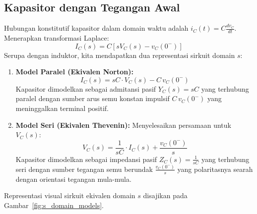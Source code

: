 \documentclass[11pt,a4paper]{article}
\theoremstyle{definition}
\begin{document}
\subsection{Kapasitor dengan Tegangan Awal}
Hubungan konstitutif kapasitor dalam domain waktu adalah $i_C(t) = C \frac{dv_C}{dt}$. Menerapkan transformasi Laplace:
\begin{equation}
    I_C(s) = C \left[ s V_C(s) - v_C(0^-) \right]
\end{equation}
Serupa dengan induktor, kita mendapatkan dua representasi sirkuit domain $s$:
\begin{enumerate}[leftmargin=*]
    \item \textbf{Model Paralel (Ekivalen Norton):}
    \begin{equation}
        I_C(s) = sC \cdot V_C(s) - C \, v_C(0^-)
        \label{eq:capacitor_norton}
    \end{equation}
    Kapasitor dimodelkan sebagai admitansi pasif $Y_C(s) = sC$ yang terhubung paralel dengan sumber arus semu konstan impulsif $C \, v_C(0^-)$ yang meninggalkan terminal positif.
    \item \textbf{Model Seri (Ekivalen Thevenin):}
    Menyelesaikan persamaan untuk $V_C(s)$:
    \begin{equation}
        V_C(s) = \frac{1}{sC} \cdot I_C(s) + \frac{v_C(0^-)}{s}
        \label{eq:capacitor_thevenin}
    \end{equation}
    Kapasitor dimodelkan sebagai impedansi pasif $Z_C(s) = \frac{1}{sC}$ yang terhubung seri dengan sumber tegangan semu berundak $\frac{v_C(0^-)}{s}$ yang polaritasnya searah dengan orientasi tegangan mula-mula.
\end{enumerate}

Representasi visual sirkuit ekivalen domain $s$ disajikan pada Gambar~\ref{fig:s_domain_models}.
\end{document}
